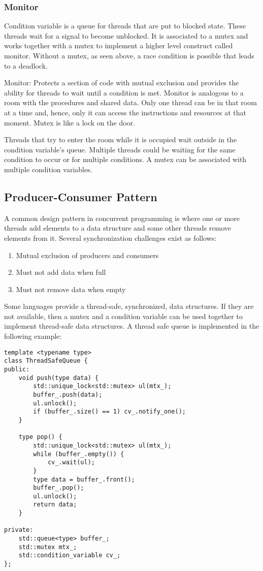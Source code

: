 \documentclass{scrartcl}
\begin{document}
\subsubsection{Monitor}
Condition variable is a queue for threads that are put to blocked state. These threads wait for a signal to become unblocked. It is associated to a mutex and works together with a mutex to implement a higher level construct called monitor. Without a mutex, as seen above, a race condition is possible that leads to a deadlock.

Monitor: Protects a section of code with mutual exclusion and provides the ability for threads to wait until a condition is met. Monitor is analogous to a room with the procedures and shared data. Only one thread can be in that room at a time and, hence, only it can access the instructions and resources at that moment. Mutex is like a lock on the door. 

Threads that try to enter the room while it is occupied wait outside in the condition variable's queue. Multiple threads could be waiting for the same condition to occur or for multiple conditions. A mutex can be associated with multiple condition variables.

\subsection{Producer-Consumer Pattern}
A common design pattern in concurrent programming is where one or more threads add elements to a data structure and some other threads remove elements from it. Several synchronization challenges exist as follows:

\begin{enumerate}
    \item Mutual exclusion of producers and consumers
    \item Must not add data when full
    \item Must not remove data when empty
\end{enumerate}

Some languages provide a thread-safe, synchronized, data structures. If they are not available, then a mutex and a condition variable can be used together to implement thread-safe data structures. A thread safe queue is implemented in the following example:

\begin{verbatim}
template <typename type>
class ThreadSafeQueue {
public:
    void push(type data) {
        std::unique_lock<std::mutex> ul(mtx_);
        buffer_.push(data);
        ul.unlock();
        if (buffer_.size() == 1) cv_.notify_one();
    }

    type pop() {
        std::unique_lock<std::mutex> ul(mtx_);
        while (buffer_.empty()) {
            cv_.wait(ul);
        }
        type data = buffer_.front();
        buffer_.pop();
        ul.unlock();
        return data;
    }

private:
    std::queue<type> buffer_;
    std::mutex mtx_;
    std::condition_variable cv_;
};
\end{verbatim}
\end{document}
